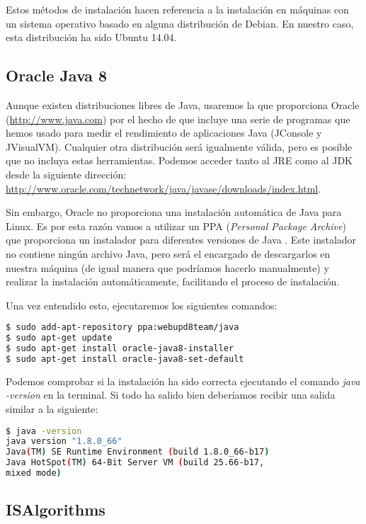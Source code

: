 Estos métodos de instalación hacen referencia a la instalación en máquinas con un sistema operativo basado en alguna distribución de Debian. En nuestro caso, esta distribución ha sido Ubuntu 14.04.

\subsection{Oracle Java 8}

Aunque existen distribuciones libres de Java, usaremos la que proporciona Oracle (\url{http://www.java.com}) por el hecho de que incluye una serie de programas que hemos usado para medir el rendimiento de aplicaciones Java (JConsole y JVisualVM). Cualquier otra distribución será igualmente válida, pero es posible que no incluya estas herramientas. Podemos acceder tanto al JRE como al JDK desde la siguiente dirección: \url{http://www.oracle.com/technetwork/java/javase/downloads/index.html}.

Sin embargo, Oracle no proporciona una instalación automática de Java para Linux. Es por esta razón vamos a utilizar un PPA (\textit{Personal Package Archive}) que proporciona un instalador para diferentes versiones de Java \cite{ppaJava}. Este instalador no contiene ningún archivo Java, pero será el encargado de descargarlos en nuestra máquina (de igual manera que podríamos hacerlo manualmente) y realizar la instalación automáticamente, facilitando el proceso de instalación.

Una vez entendido esto, ejecutaremos los siguientes comandos:

\begin{lstlisting}[language=bash,keywordstyle=\color{black}]
$ sudo add-apt-repository ppa:webupd8team/java
$ sudo apt-get update
$ sudo apt-get install oracle-java8-installer
$ sudo apt-get install oracle-java8-set-default
\end{lstlisting}

Podemos comprobar si la instalación ha sido correcta ejecutando el comando \textit{java -version} en la terminal. Si todo ha salido bien deberíamos recibir una salida similar a la siguiente:

\begin{lstlisting}[language=bash]
$ java -version
java version "1.8.0_66"
Java(TM) SE Runtime Environment (build 1.8.0_66-b17)
Java HotSpot(TM) 64-Bit Server VM (build 25.66-b17,
mixed mode)
\end{lstlisting}


\subsection{ISAlgorithms}\label{subsec:InstalarISAlgorithms}

